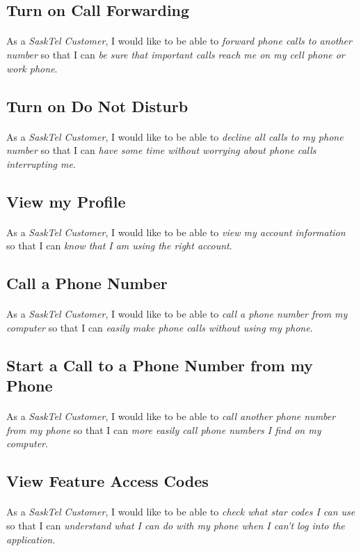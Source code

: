 \documentclass[12pt]{article}
\begin{document}
\subsection{Turn on Call Forwarding}
\paragraph{}	As a \textit{SaskTel Customer}, I would like to be able to \textit{forward phone calls to another number} so that I can \textit{be sure that important calls reach me on my cell phone or work phone}.

\subsection{Turn on Do Not Disturb}
\paragraph{}	As a \textit{SaskTel Customer}, I would like to be able to \textit{decline all calls to my phone number} so that I can \textit{have some time without worrying about phone calls interrupting me}.

\subsection{View my Profile}
\paragraph{}	As a \textit{SaskTel Customer}, I would like to be able to \textit{view my account information} so that I can \textit{know that I am using the right account}.

\subsection{Call a Phone Number}
\paragraph{}	As a \textit{SaskTel Customer}, I would like to be able to \textit{call a phone number from my computer} so that I can \textit{easily make phone calls without using my phone}.

\subsection{Start a Call to a Phone Number from my Phone}
\paragraph{}	As a \textit{SaskTel Customer}, I would like to be able to \textit{call another phone number from my phone} so that I can \textit{more easily call phone numbers I find on my computer}.

\subsection{View Feature Access Codes}
\paragraph{}	As a \textit{SaskTel Customer}, I would like to be able to \textit{check what star codes I can use} so that I can \textit{understand what I can do with my phone when I can't log into the application}.
\end{document}
